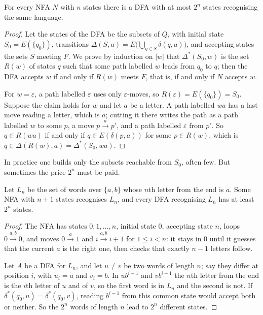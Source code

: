 \begin{theorem}\label{thm:subset}
For every NFA $N$ with $n$ states there is a DFA with at most $2^n$ states recognising the same language.
\end{theorem}

\begin{proof}
Let the states of the DFA be the subsets of $Q$, with initial state $S_0=E(\{q_0\})$, transitions $\Delta(S,a)=E\bigl(\bigcup_{q\in S}\delta(q,a)\bigr)$, and accepting states the sets $S$ meeting $F$. We prove by induction on $|w|$ that $\Delta^*(S_0,w)$ is the set $R(w)$ of states $q$ such that some path labelled $w$ leads from $q_0$ to $q$; then the DFA accepts $w$ if and only if $R(w)$ meets $F$, that is, if and only if $N$ accepts $w$.

For $w=\varepsilon$, a path labelled $\varepsilon$ uses only $\varepsilon$-moves, so $R(\varepsilon)=E(\{q_0\})=S_0$. Suppose the claim holds for $w$ and let $a$ be a letter. A path labelled $wa$ has a last move reading a letter, which is $a$; cutting it there writes the path as a path labelled $w$ to some $p$, a move $p\xrightarrow{a}p'$, and a path labelled $\varepsilon$ from $p'$. So $q\in R(wa)$ if and only if $q\in E(\delta(p,a))$ for some $p\in R(w)$, which is $q\in\Delta(R(w),a)=\Delta^*(S_0,wa)$.
\end{proof}

In practice one builds only the subsets reachable from $S_0$, often few. But sometimes the price $2^n$ must be paid.

\begin{proposition}\label{prop:blowup}
Let $L_n$ be the set of words over $\{a,b\}$ whose $n$th letter from the end is $a$. Some NFA with $n+1$ states recognises $L_n$, and every DFA recognising $L_n$ has at least $2^n$ states.
\end{proposition}

\begin{proof}
The NFA has states $0,1,\dots,n$, initial state $0$, accepting state $n$, loops $0\xrightarrow{a,b}0$, and moves $0\xrightarrow{a}1$ and $i\xrightarrow{a,b}i+1$ for $1\le i<n$: it stays in $0$ until it guesses that the current $a$ is the right one, then checks that exactly $n-1$ letters follow.

Let $A$ be a DFA for $L_n$, and let $u\ne v$ be two words of length $n$; say they differ at position $i$, with $u_i=a$ and $v_i=b$. In $ub^{i-1}$ and $vb^{i-1}$ the $n$th letter from the end is the $i$th letter of $u$ and of $v$, so the first word is in $L_n$ and the second is not. If $\delta^*(q_0,u)=\delta^*(q_0,v)$, reading $b^{i-1}$ from this common state would accept both or neither. So the $2^n$ words of length $n$ lead to $2^n$ different states.
\end{proof}

